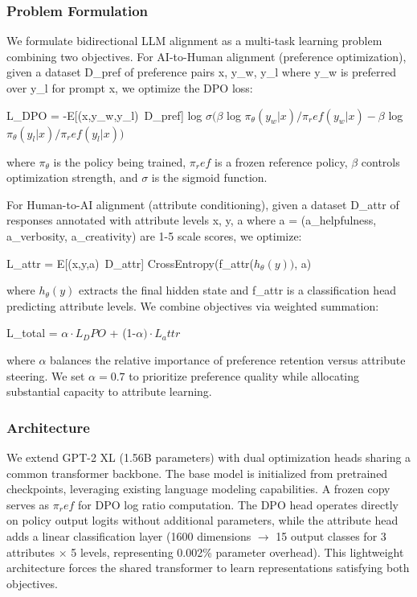 
\subsubsection{Problem Formulation}

We formulate bidirectional LLM alignment as a multi-task learning problem combining two objectives. For AI-to-Human alignment (preference optimization), given a dataset D\_pref of preference pairs {x, y\_w, y\_l} where y\_w is preferred over y\_l for prompt x, we optimize the DPO loss:

L\_DPO = -E[(x,y\_w,y\_l)~D\_pref] log $\sigma (\beta$ log $\pi _\theta (y_{w}|x)/\pi _ref(y_{w}|x) - \beta$ log $\pi _\theta (y_{l}|x)/\pi _ref(y_{l}|x))$

where $\pi _\theta$ is the policy being trained, $\pi _ref$ is a frozen reference policy, $\beta$ controls optimization strength, and $\sigma$ is the sigmoid function.

For Human-to-AI alignment (attribute conditioning), given a dataset D\_attr of responses annotated with attribute levels {x, y, a} where a = (a\_helpfulness, a\_verbosity, a\_creativity) are 1-5 scale scores, we optimize:

L\_attr = E[(x,y,a)~D\_attr] CrossEntropy(f\_attr($h_\theta (y))$, a)

where $h_\theta (y)$ extracts the final hidden state and f\_attr is a classification head predicting attribute levels. We combine objectives via weighted summation:

L\_total = $\alpha \cdot L_DPO$ + (1-$\alpha )\cdot L_attr$

where $\alpha$ balances the relative importance of preference retention versus attribute steering. We set $\alpha =0.7$ to prioritize preference quality while allocating substantial capacity to attribute learning.

\subsubsection{Architecture}

We extend GPT-2 XL (1.56B parameters) with dual optimization heads sharing a common transformer backbone. The base model is initialized from pretrained checkpoints, leveraging existing language modeling capabilities. A frozen copy serves as $\pi _ref$ for DPO log ratio computation. The DPO head operates directly on policy output logits without additional parameters, while the attribute head adds a linear classification layer (1600 dimensions $\rightarrow$ 15 output classes for 3 attributes $\times$ 5 levels, representing 0.002\% parameter overhead). This lightweight architecture forces the shared transformer to learn representations satisfying both objectives.

